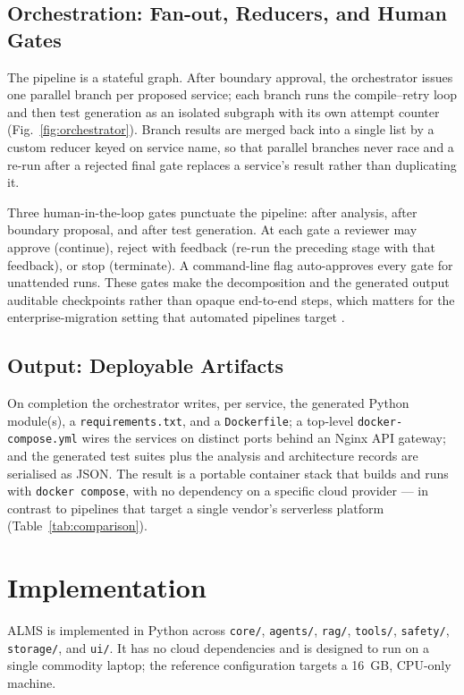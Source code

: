 \documentclass[conference]{IEEEtran}
\begin{document}
\subsection{Orchestration: Fan-out, Reducers, and Human Gates}

The pipeline is a stateful graph. After boundary approval, the orchestrator issues one parallel branch per proposed service; each branch runs the compile--retry loop and then test generation as an isolated subgraph with its own attempt counter (Fig.~\ref{fig:orchestrator}). Branch results are merged back into a single list by a custom reducer keyed on service name, so that parallel branches never race and a re-run after a rejected final gate replaces a service's result rather than duplicating it.

Three human-in-the-loop gates punctuate the pipeline: after analysis, after boundary proposal, and after test generation. At each gate a reviewer may approve (continue), reject with feedback (re-run the preceding stage with that feedback), or stop (terminate). A command-line flag auto-approves every gate for unattended runs. These gates make the decomposition and the generated output auditable checkpoints rather than opaque end-to-end steps, which matters for the enterprise-migration setting that automated pipelines target \cite{kalia2021}.

\subsection{Output: Deployable Artifacts}

On completion the orchestrator writes, per service, the generated Python module(s), a \texttt{requirements.txt}, and a \texttt{Dockerfile}; a top-level \texttt{docker-compose.yml} wires the services on distinct ports behind an Nginx API gateway; and the generated test suites plus the analysis and architecture records are serialised as JSON. The result is a portable container stack that builds and runs with \texttt{docker compose}, with no dependency on a specific cloud provider --- in contrast to pipelines that target a single vendor's serverless platform \cite{chen2026} (Table~\ref{tab:comparison}).

\section{Implementation}

ALMS is implemented in Python across \texttt{core/}, \texttt{agents/}, \texttt{rag/}, \texttt{tools/}, \texttt{safety/}, \texttt{storage/}, and \texttt{ui/}. It has no cloud dependencies and is designed to run on a single commodity laptop; the reference configuration targets a 16~GB, CPU-only machine.
\end{document}
